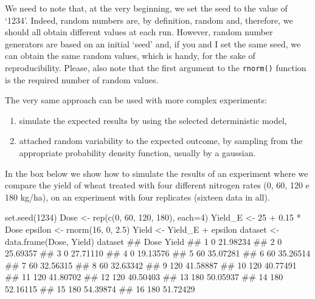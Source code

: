 \documentclass[a4paper,12pt,oneside]{book}
\providecommand{\tightlist}{%
  \setlength{\itemsep}{0pt}\setlength{\parskip}{0pt}}
\newenvironment{Shaded}{\begin{snugshade}}{\end{snugshade}}
\newcommand{\DecValTok}[1]{#1}
\newcommand{\FloatTok}[1]{#1}
\newcommand{\SpecialCharTok}[1]{#1}
\newcommand{\DocumentationTok}[1]{#1}
\newcommand{\OtherTok}[1]{#1}
\newcommand{\FunctionTok}[1]{#1}
\newcommand{\AttributeTok}[1]{#1}
\newcommand{\NormalTok}[1]{#1}
\begin{document}
We need to note that, at the very beginning, we set the seed to the value of `1234'. Indeed, random numbers are, by definition, random and, therefore, we should all obtain different values at each run. However, random number generators are based on an initial `seed' and, if you and I set the same seed, we can obtain the same random values, which is handy, for the sake of reproducibility. Please, also note that the first argument to the \texttt{rnorm()} function is the required number of random values.

The very same approach can be used with more complex experiments:

\begin{enumerate}
\def\labelenumi{\arabic{enumi}.}
\tightlist
\item
  simulate the expected results by using the selected deterministic model,
\item
  attached random variability to the expected outcome, by sampling from the appropriate probability density function, usually by a gaussian.
\end{enumerate}

In the box below we show how to simulate the results of an experiment where we compare the yield of wheat treated with four different nitrogen rates (0, 60, 120 e 180 kg/ha), on an experiment with four replicates (sixteen data in all).

\begin{Shaded}
\begin{Highlighting}[]
\FunctionTok{set.seed}\NormalTok{(}\DecValTok{1234}\NormalTok{)}
\NormalTok{Dose }\OtherTok{\textless{}{-}} \FunctionTok{rep}\NormalTok{(}\FunctionTok{c}\NormalTok{(}\DecValTok{0}\NormalTok{, }\DecValTok{60}\NormalTok{, }\DecValTok{120}\NormalTok{, }\DecValTok{180}\NormalTok{), }\AttributeTok{each=}\DecValTok{4}\NormalTok{) }
\NormalTok{Yield\_E }\OtherTok{\textless{}{-}} \DecValTok{25} \SpecialCharTok{+} \FloatTok{0.15} \SpecialCharTok{*}\NormalTok{ Dose}
\NormalTok{epsilon }\OtherTok{\textless{}{-}} \FunctionTok{rnorm}\NormalTok{(}\DecValTok{16}\NormalTok{, }\DecValTok{0}\NormalTok{, }\FloatTok{2.5}\NormalTok{)}
\NormalTok{Yield }\OtherTok{\textless{}{-}}\NormalTok{ Yield\_E }\SpecialCharTok{+}\NormalTok{ epsilon}
\NormalTok{dataset }\OtherTok{\textless{}{-}} \FunctionTok{data.frame}\NormalTok{(Dose, Yield)}
\NormalTok{dataset}
\DocumentationTok{\#\#    Dose    Yield}
\DocumentationTok{\#\# 1     0 21.98234}
\DocumentationTok{\#\# 2     0 25.69357}
\DocumentationTok{\#\# 3     0 27.71110}
\DocumentationTok{\#\# 4     0 19.13576}
\DocumentationTok{\#\# 5    60 35.07281}
\DocumentationTok{\#\# 6    60 35.26514}
\DocumentationTok{\#\# 7    60 32.56315}
\DocumentationTok{\#\# 8    60 32.63342}
\DocumentationTok{\#\# 9   120 41.58887}
\DocumentationTok{\#\# 10  120 40.77491}
\DocumentationTok{\#\# 11  120 41.80702}
\DocumentationTok{\#\# 12  120 40.50403}
\DocumentationTok{\#\# 13  180 50.05937}
\DocumentationTok{\#\# 14  180 52.16115}
\DocumentationTok{\#\# 15  180 54.39874}
\DocumentationTok{\#\# 16  180 51.72429}
\end{Highlighting}
\end{Shaded}
\end{document}
